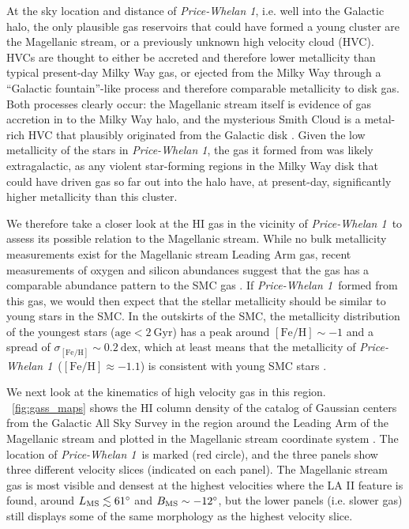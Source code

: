 \documentclass[twocolumn]{aastex62}
\newcommand{\feh}{\ensuremath{[\textrm{Fe} / \textrm{H}]}}
\newcommand{\hi}{H{\footnotesize I} }
\newcommand{\clustername}{\textsl{Price-Whelan 1}}
\begin{document}
At the sky location and distance of \clustername, i.e. well into the Galactic halo, the only plausible gas reservoirs that could have formed a young cluster are the Magellanic stream, or a previously unknown high velocity cloud (HVC).
HVCs are thought to either be accreted and therefore lower metallicity than typical present-day Milky Way gas, or ejected from the Milky Way through a ``Galactic fountain''-like process and therefore comparable metallicity to disk gas.
Both processes clearly occur: the Magellanic stream itself is evidence of gas accretion in to the Milky Way halo, and the mysterious Smith Cloud \citep{Smith:1963} is a metal-rich \citep[$\feh \sim 0.5$][]{Fox:2016} HVC that plausibly originated from the Galactic disk \citep[e.g.,][]{Bregman:1980}.
Given the low metallicity of the stars in \clustername, the gas it formed from was likely extragalactic, as any violent star-forming regions in the Milky Way disk that could have driven gas so far out into the halo have, at present-day, significantly higher metallicity than this cluster.

We therefore take a closer look at the \hi gas in the vicinity of \clustername\ to assess its possible relation to the Magellanic stream.
While no bulk metallicity measurements exist for the Magellanic stream Leading Arm gas, recent measurements of oxygen and silicon abundances suggest that the gas has a comparable abundance pattern to the SMC gas \citep{Fox:2018, Richter:2018}.
If \clustername\ formed from this gas, we would then expect that the stellar metallicity should be similar to young stars in the SMC.
In the outskirts of the SMC, the metallicity distribution of the youngest stars ($\textrm{age} < 2~\textrm{Gyr}$) has a peak around $\feh \sim -1$ and a spread of $\sigma_{\feh} \sim 0.2~\textrm{dex}$, which at least means that the metallicity of \clustername\ ($\feh \approx -1.1$) is consistent with young SMC stars \citep{Dobbie:2014}.

We next look at the kinematics of high velocity gas in this region.
\figurename~\ref{fig:gass_maps} shows the \hi column density of the catalog of Gaussian centers \citep[producted with the techniques and software from][]{Nidever:2008} from the Galactic All Sky Survey \citep[GASS;][]{McClure-Griffiths:2009, Kalberla:2010} in the region around the Leading Arm of the Magellanic stream and plotted in the Magellanic stream coordinate system \citep[$L_{\rm MS}, B_{\rm MS}$;][]{Nidever:2008}.
The location of \clustername\ is marked (red circle), and the three panels show three different velocity slices (indicated on each panel).
The Magellanic stream gas is most visible and densest at the highest velocities where the LA II feature is found, around $L_{\rm MS} \lesssim 61^\circ$ and $B_{\rm MS} \sim -12^\circ$, but the lower panels (i.e. slower gas) still displays some of the same morphology as the highest velocity slice.
\end{document}

